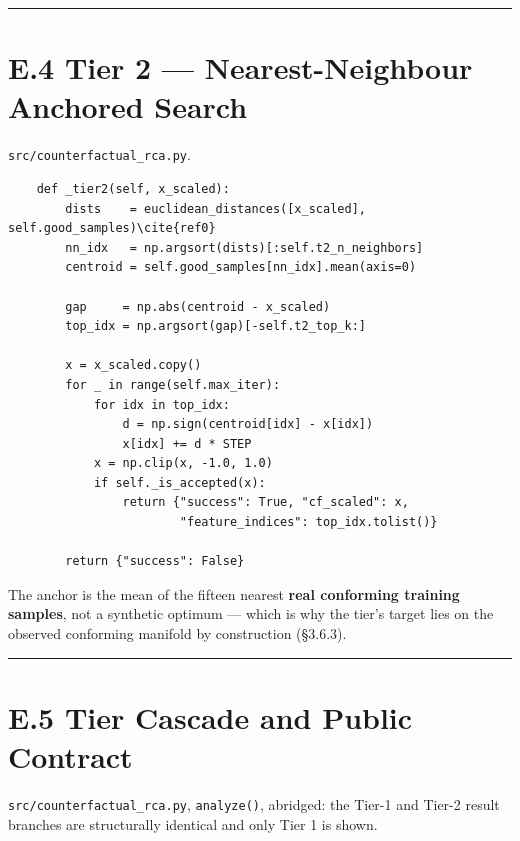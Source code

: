 \begin{center}\rule{0.5\linewidth}{0.5pt}\end{center}

\hypertarget{e.4-tier-2-nearest-neighbour-anchored-search}{%
\section{E.4 Tier 2 --- Nearest-Neighbour Anchored Search}\label{e.4-tier-2-nearest-neighbour-anchored-search}}

\texttt{src/counterfactual\_rca.py}.

\begin{verbatim}
    def _tier2(self, x_scaled):
        dists    = euclidean_distances([x_scaled], self.good_samples)\cite{ref0}
        nn_idx   = np.argsort(dists)[:self.t2_n_neighbors]
        centroid = self.good_samples[nn_idx].mean(axis=0)

        gap     = np.abs(centroid - x_scaled)
        top_idx = np.argsort(gap)[-self.t2_top_k:]

        x = x_scaled.copy()
        for _ in range(self.max_iter):
            for idx in top_idx:
                d = np.sign(centroid[idx] - x[idx])
                x[idx] += d * STEP
            x = np.clip(x, -1.0, 1.0)
            if self._is_accepted(x):
                return {"success": True, "cf_scaled": x,
                        "feature_indices": top_idx.tolist()}

        return {"success": False}
\end{verbatim}

The anchor is the mean of the fifteen nearest \textbf{real conforming training samples}, not a synthetic optimum --- which is why the tier's target lies on the observed conforming manifold by construction (§3.6.3).

\begin{center}\rule{0.5\linewidth}{0.5pt}\end{center}

\hypertarget{e.5-tier-cascade-and-public-contract}{%
\section{E.5 Tier Cascade and Public Contract}\label{e.5-tier-cascade-and-public-contract}}

\texttt{src/counterfactual\_rca.py}, \texttt{analyze()}, abridged: the Tier-1 and Tier-2 result branches are structurally identical and only Tier 1 is shown.

